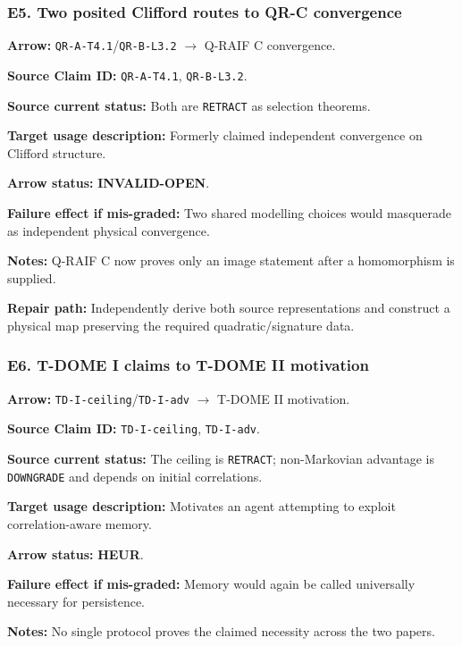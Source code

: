\documentclass[12pt,a4paper]{article}
\begin{document}
\subsubsection*{E5. Two posited Clifford routes to QR-C convergence}
\noindent\textbf{Arrow:} \texttt{QR-A-T4.1}/\texttt{QR-B-L3.2}
\(\to\) Q-RAIF C convergence.\par
\noindent\textbf{Source Claim ID:} \texttt{QR-A-T4.1},
\texttt{QR-B-L3.2}.\par
\noindent\textbf{Source current status:} Both are \texttt{RETRACT} as
selection theorems.\par
\noindent\textbf{Target usage description:} Formerly claimed independent
convergence on Clifford structure.\par
\noindent\textbf{Arrow status:} \textbf{INVALID-OPEN}.\par
\noindent\textbf{Failure effect if mis-graded:} Two shared modelling
choices would masquerade as independent physical convergence.\par
\noindent\textbf{Notes:} Q-RAIF C now proves only an image statement
after a homomorphism is supplied.\par
\noindent\textbf{Repair path:} Independently derive both source
representations and construct a physical map preserving the required
quadratic/signature data.\par

\subsubsection*{E6. T-DOME I claims to T-DOME II motivation}
\noindent\textbf{Arrow:} \texttt{TD-I-ceiling}/\texttt{TD-I-adv}
\(\to\) T-DOME II motivation.\par
\noindent\textbf{Source Claim ID:} \texttt{TD-I-ceiling},
\texttt{TD-I-adv}.\par
\noindent\textbf{Source current status:} The ceiling is
\texttt{RETRACT}; non-Markovian advantage is \texttt{DOWNGRADE} and
depends on initial correlations.\par
\noindent\textbf{Target usage description:} Motivates an agent attempting
to exploit correlation-aware memory.\par
\noindent\textbf{Arrow status:} \textbf{HEUR}.\par
\noindent\textbf{Failure effect if mis-graded:} Memory would again be
called universally necessary for persistence.\par
\noindent\textbf{Notes:} No single protocol proves the claimed
necessity across the two papers.\par
\end{document}

